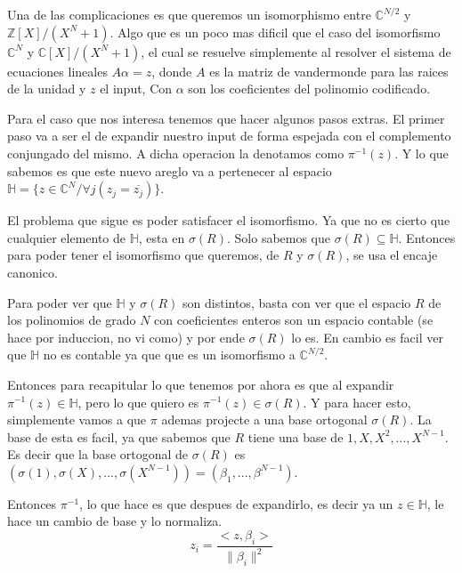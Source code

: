 \documentclass[12pt, oneside]{article}
\begin{document}
Una de las complicaciones es que queremos un isomorphismo entre $\mathbb{C}^{N/2}$ y
$\mathbb{Z}[X]/(X^N+1)$.
Algo que es un poco mas dificil que el caso del isomorfismo
$\mathbb{C}^{N}$ y $\mathbb{C}[X]/(X^N+1)$, el cual se resuelve simplemente
al resolver el sistema de ecuaciones lineales $A\alpha=z$, donde $A$ es la
matriz de vandermonde para las raices de la unidad y $z$ el input,
Con $\alpha$ son los coeficientes del polinomio codificado.

Para el caso que nos interesa tenemos que hacer algunos pasos extras.
El primer paso va a ser el de expandir nuestro input de forma espejada con el
complemento conjungado del mismo.
A dicha operacion la denotamos como $\pi^{-1}(z)$.
Y lo que sabemos es que este nuevo areglo va a pertenecer al espacio
$\mathbb{H}=\{z\in\mathbb{C}^N/ \forall j (z_j=\overline{z_j})\}$.

El problema que sigue es poder satisfacer el isomorfismo.
Ya que no es cierto que cualquier elemento de $\mathbb{H}$,
esta en $\sigma(R)$.
Solo sabemos que $\sigma(R)\subseteq \mathbb{H}$.
Entonces para poder tener el isomorfismo que queremos, de $R$ y $\sigma(R)$,
se usa el encaje canonico.

Para poder ver que $\mathbb{H}$ y $\sigma(R)$ son distintos, basta con ver que
el espacio $R$ de los polinomios de grado $N$ con coeficientes enteros son un espacio
contable (se hace por induccion, no vi como) y por ende $\sigma(R)$ lo es.
En cambio es facil ver que $\mathbb{H}$ no es contable ya que que es un isomorfismo
a $\mathbb{C}^{N/2}$.

Entonces para recapitular lo que tenemos por ahora es que al expandir $\pi^{-1}(z)\in\mathbb{H}$,
pero lo que quiero es $\pi^{-1}(z)\in\sigma(R)$.
Y para hacer esto, simplemente vamos a que $\pi$ ademas projecte a una base ortogonal  $\sigma(R)$.
La base de esta es facil, ya que sabemos que $R$ tiene una base de $1, X, X^2, ..., X^{N-1}$.
Es decir que la base ortogonal de  $\sigma(R)$ es $(\sigma(1), \sigma(X),..., \sigma(X^{N-1}))=(\beta_1,...,\beta^{N-1})$.

Entonces $\pi^{-1}$, lo que hace es que despues de expandirlo, es decir ya un $z\in\mathbb{H}$,
le hace un cambio de base y lo normaliza.
\begin{equation*}
    z_i = \frac{<z,\beta_i>}{\parallel\beta_i\parallel^2}
    \label{eq:expand}
\end{equation*}
\end{document}
